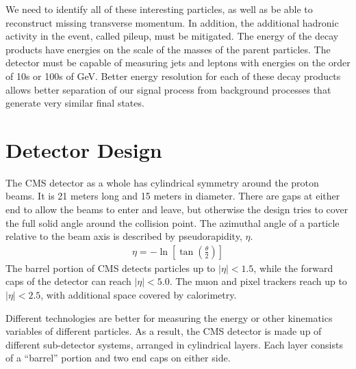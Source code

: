 We need to identify all of these interesting particles,
as well as be able to reconstruct missing transverse momentum.
In addition, the additional hadronic activity in the event, called pileup, must be mitigated.
The energy of the decay products have energies on the scale of
the masses of the parent particles.
The detector must be capable of measuring jets and leptons with energies on the
order of 10s or 100s of GeV.
Better energy resolution for each of these decay products allows better separation
of our signal process from background processes that generate very similar final states.

\section{Detector Design} \label{sec:design}

The CMS detector as a whole has cylindrical symmetry around the proton beams.
It is 21 meters long and 15 meters in diameter.
There are gaps at either end to allow the beams to enter and leave,
but otherwise the design tries to cover the full solid angle around the collision point.
The azimuthal angle of a particle relative to the beam axis is described
by pseudorapidity, $\eta$.
\begin{gather}
  \eta = -\ln \left[\tan \left( \frac \theta 2 \right) \right]
\end{gather}
The barrel portion of CMS detects particles up to $|\eta| < 1.5$,
while the forward caps of the detector can reach $|\eta| < 5.0$.
The muon and pixel trackers reach up to $|\eta| < 2.5$,
with additional space covered by calorimetry. 

Different technologies are better for measuring the energy
or other kinematics variables of different particles.
As a result, the CMS detector is made up of different sub-detector systems,
arranged in cylindrical layers.
Each layer consists of a ``barrel'' portion and two end caps on either side.

